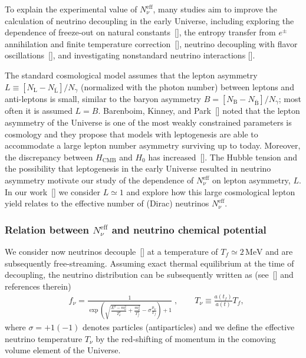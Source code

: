 To explain the experimental value of $N_\nu^{\mathrm{eff}}$, many studies aim to improve the calculation of neutrino decoupling in the early Universe, including exploring the dependence of freeze-out on natural constants~[\cite{Birrell:2014uka}], the entropy transfer from $e^\pm$ annihilation and finite temperature correction~[\cite{Dicus:1982bz,Heckler:1994tv,Fornengo:1997wa}], neutrino decoupling with flavor oscillations~[\cite{Mangano:2001iu,Mangano:2005cc}], and investigating nonstandard neutrino interactions [\cite{Morgan:1981zy,Fukugita:1987uy,Elmfors:1997tt,Vogel:1989iv,Mangano:2006ar,Giunti:2008ve,Mangano:2006ar}].%


The standard cosmological model assumes that the lepton asymmetry $L\equiv  [N_\mathrm{L}-N_{\overline{\mathrm{L}}}] /N_\gamma $  (normalized with the photon number) 
between leptons and anti-leptons is small, similar to the baryon asymmetry $B=[N_\mathrm{B}-N_{\overline{\mathrm{B}}}]/N_\gamma $; most often it is assumed $L=B$. Barenboim, Kinney, and Park~[\cite{Barenboim:2016shh,Barenboim:2017dfq}] noted that the lepton asymmetry of the Universe is one of the most weakly constrained parameters is cosmology and they propose that models with leptogenesis are able to accommodate a large lepton number asymmetry surviving up to today.  Moreover, the discrepancy between $H_\mathrm{CMB}$ and $H_0$ has increased~[\cite{riess2018new,Riess:2018byc,Planck:2018vyg}]. The Hubble tension and the possibility that leptogenesis in the early Universe resulted in neutrino asymmetry motivate our study of the dependence of $N_\nu^{\mathrm{eff}}$ on lepton asymmetry, $L$. In our work~[\cite{Yang:2018oqg}] we consider $L\simeq 1$ and explore how this large cosmological lepton yield relates to the effective number of (Dirac) neutrinos $N^{\mathrm{eff}}_\nu$. 

\subsubsection{Relation between $N_\nu^{\mathrm{eff}}$ and neutrino chemical potential}
We consider now neutrinos decouple~[\cite{Birrell:2014gea}] at a temperature of $T_f\simeq 2\,\mathrm{MeV}$ and are subsequently free-streaming. Assuming exact thermal equilibrium at the time of decoupling, the neutrino distribution can be subsequently written as (see~[\cite{Birrell:2012gg}] and references therein)
\begin{align}
\label{fnudef}
&f_\nu=\frac{1}{\exp{\left(\sqrt{\frac{E^2-m_\nu^2}{T_\nu^2}+\frac{m^2_\nu}{T^2_f}}-\sigma\frac{\mu_\nu}{T_f}\right)+1}}\;,\qquad T_\nu\equiv\frac{a(t_f)}{a(t)}T_f,
\end{align}
where $\sigma=+1(-1)$ denotes particles (antiparticles) and we define the effective neutrino temperature $T_\nu$  by the red-shifting of momentum in the comoving volume element of the Universe.


